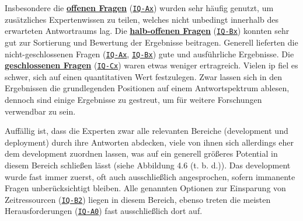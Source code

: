 Insbesondere die \textbf{\hyperref[subsec:AA-01-01_open-questions]{offenen Fragen}} (\texttt{\hyperref[subsec:AA-01-01_open-questions]{IQ-Ax}}) wurden sehr häufig genutzt, um zusätzliches Expertenwissen zu teilen, welches nicht unbedingt innerhalb des erwarteten Antwortraums lag. Die \textbf{\hyperref[subsec:AA-01-02_half-open-questions]{halb-offenen Fragen}} (\texttt{\hyperref[subsec:AA-01-02_half-open-questions]{IQ-Bx}}) konnten sehr gut zur Sortierung und Bewertung der Ergebnisse beitragen. Generell lieferten die nicht-geschlossenen Fragen (\texttt{\hyperref[subsec:AA-01-01_open-questions]{IQ-Ax}}, \texttt{\hyperref[subsec:AA-01-02_half-open-questions]{IQ-Bx}}) gute und ausführliche Ergebnisse. Die \textbf{\hyperref[subsec:AA-01-03_closed-questions]{geschlossenen Fragen}} (\texttt{\hyperref[subsec:AA-01-03_closed-questions]{IQ-Cx}}) waren etwas weniger ertragreich. Vielen \acrlong{ip} fiel es schwer, sich auf einen quantitativen Wert festzulegen. Zwar lassen sich in den Ergebnissen die grundlegenden Positionen auf einem Antwortspektrum ablesen, dennoch sind einige Ergebnisse zu gestreut, um für weitere Forschungen verwendbar zu sein.

Auffällig ist, dass die Experten zwar alle relevanten Bereiche (\Gls{development} und \Gls{deployment}) durch ihre Antworten abdecken, viele von ihnen sich allerdings eher dem \Gls{development} zuordnen lassen, was auf ein generell größeres Potential in diesem Bereich schließen lässt (siehe Abbildung 4.6 (t. b. d.)). Das \Gls{development} wurde fast immer zuerst, oft auch ausschließlich angesprochen, sofern immanente Fragen unberücksichtigt bleiben. Alle genannten Optionen zur Einsparung von Zeitressourcen (\texttt{\hyperref[subsec:AA-03-02_half-open-questions]{IQ-B2}}) liegen in diesem Bereich, ebenso treten die meisten Herausforderungen (\texttt{\hyperref[subsec:AA-03-01_open-questions]{IQ-A0}}) fast ausschließlich dort auf.

